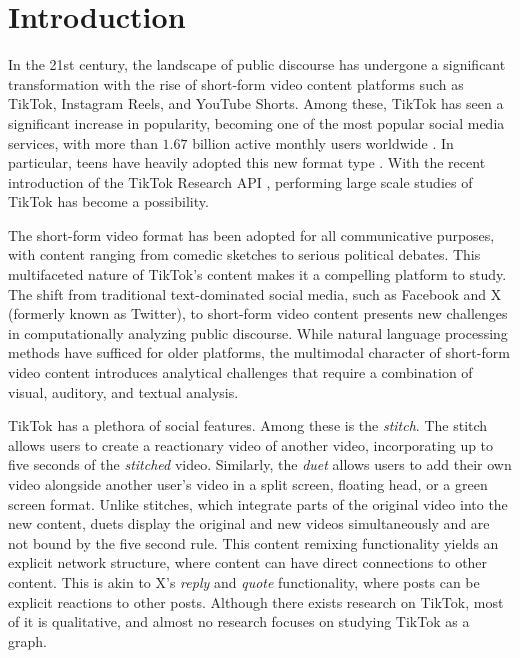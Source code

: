 \chapter{Introduction}

In the 21st century, the landscape of public discourse has undergone a significant transformation with the rise of short-form video content platforms such as TikTok, Instagram Reels, and YouTube Shorts.  Among these, TikTok has seen a significant increase in popularity, becoming one of the most popular social media services, with more than $1.67$ billion active monthly users worldwide \citep{tiktok_popular}. In particular, teens have heavily adopted this new format type \citep{tiktok_teens}. With the recent introduction of the TikTok Research API \citep{tiktokresearchapi}, performing large scale studies of TikTok has become a possibility. 

The short-form video format has been adopted for all communicative purposes, with content ranging from comedic sketches to serious political debates. This multifaceted nature of TikTok’s content makes it a compelling platform to study. The shift from traditional text-dominated social media, such as Facebook and X (formerly known as Twitter), to short-form video content presents new challenges in computationally analyzing public discourse. While natural language processing methods have sufficed for older platforms, the multimodal character of short-form video content introduces analytical challenges that require a combination of visual, auditory, and textual analysis.

TikTok has a plethora of social features. Among these is the \textit{stitch}. The stitch allows users to create a reactionary video of another video, incorporating up to five seconds of the \textit{stitched} video. Similarly, the \textit{duet} allows users to add their own video alongside another user's video in a split screen, floating head, or a green screen format. Unlike stitches, which integrate parts of the original video into the new content, duets display the original and new videos simultaneously and are not bound by the five second rule. This content remixing functionality yields an explicit network structure, where content can have direct connections to other content. This is akin to X's \textit{reply} and \textit{quote} functionality, where posts can be explicit reactions to other posts. Although there exists research on TikTok, most of it is qualitative, and almost no research focuses on studying TikTok as a graph. 

